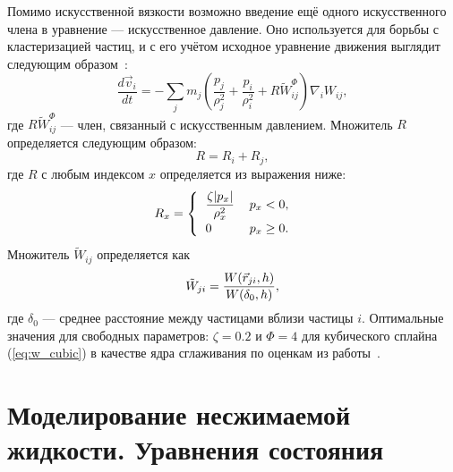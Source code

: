 Помимо искусственной вязкости возможно введение ещё одного искусственного члена в уравнение --- искусственное давление.
%
Оно используется для борьбы с кластеризацией частиц, и с его учётом исходное уравнение движения выглядит следующим образом~\cite{Monaghan2000}:
%
\begin{equation}
    \frac{d\Vec{v}_i}{d t} = -\sum\limits_{j} m_{j} 
        \left(
            \frac{p_{j}}{\rho_{j}^{2}} + \frac{p_{i}}{\rho_{i}^{2}} + R\tilde{W}_{ij}^{\varPhi} 
        \right) \nabla_{i} W_{ij},
\end{equation}
%
где $R\tilde{W}_{ij}^{\varPhi}$ --- член, связанный с искусственным давлением.
%
Множитель $R$ определяется следующим образом:
%
\begin{equation}
    R = R_{i} + R_{j},
\end{equation}
%
где $R$ с любым индексом $x$ определяется из выражения ниже:
%
\begin{equation}\label{eq:artpress1}
    R_{x} = 
    \begin{cases}
        \begin{tabular}{l l}
            $\displaystyle{
            \frac{\zeta|p_{x}|}{\rho_{x}^{2}}
            }$
            &
            $p_{x} < 0$, 
            
            \\
            
            0
            &
            $p_{x} \geq 0$.
        \end{tabular}  
    \end{cases} 
\end{equation}
%
Множитель $\tilde{W}_{ij}$ определяется как
%
\begin{equation}
    \Tilde{W}_{ji} = \frac{W(\vec{r}_{ji}, h)}{W(\delta_{0}, h)},
\end{equation}
%
где $\delta_{0}$ --- среднее расстояние между частицами вблизи частицы $i$.
%
Оптимальные значения для свободных параметров: $\zeta=0.2$ и $\varPhi=4$ для кубического сплайна (\ref{eq:w_cubic})
в качестве ядра сглаживания по оценкам из работы~\cite{Monaghan2000}.

\section{Моделирование несжимаемой жидкости. Уравнения состояния}


